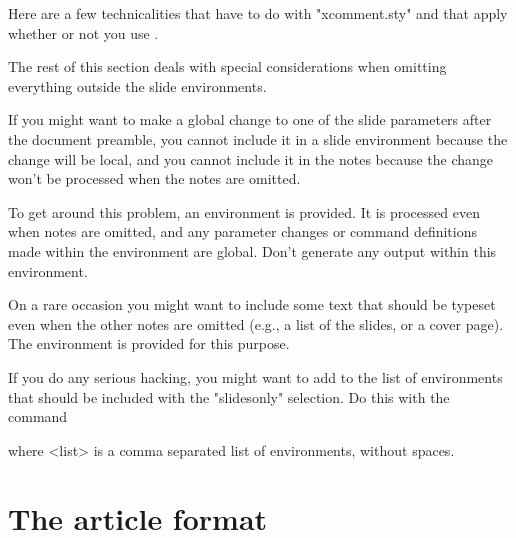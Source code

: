 Here are a few technicalities that have to do with "xcomment.sty" and that
apply whether or not you use \n\noxcomment.

The rest of this section deals with special considerations when omitting
everything outside the slide environments.

If you might want to make a global change to one of the slide parameters after
the document preamble, you cannot include it in a slide environment because
the change will be local, and you cannot include it in the notes because the
change won't be processed when the notes are omitted.

To get around this problem, an environment  is provided. It is
processed even when notes are omitted, and any parameter changes or command
definitions made within the environment are global. Don't generate any output
within this environment.

On a rare occasion you might want to include some text that should be typeset
even when the other notes are omitted (e.g.,  a list of the slides, or a cover
page). The  environment is provided for this purpose.

If you do any serious hacking, you might want to add to the list of
environments that should be included with the "slidesonly" selection. Do this
with the command
\begin{MD}
\end{MD}
where <list> is a comma separated list of environments, without spaces.

\section{The article format\label{S-article}}

